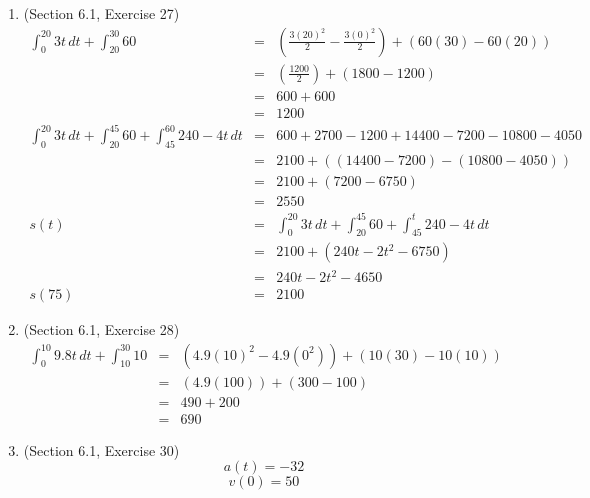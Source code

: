 \documentclass{article}
\begin{document}
\begin{enumerate}
    \item (Section 6.1, Exercise 27)
        \begin{eqnarray}
            \int_0^{20}{3t\,dt} + \int_{20}^{30}{60} &=& \left(\frac{3(20)^2}{2} - \frac{3(0)^2}{2}\right) + \left(60(30) - 60(20)\right) \\
                                                     &=& \left(\frac{1200}{2}\right) + \left(1800 - 1200\right) \\
                                                     &=& 600 + 600 \\
                                                     &=& 1200 \\
            \int_0^{20}{3t\,dt} + \int_{20}^{45}{60} + \int_{45}^{60}{240 - 4t\,dt} &=& 600 + 2700 - 1200 + 14400 - 7200 - 10800 - 4050 \\
                                                                                    &=& 2100 + \left(\left(14400 - 7200\right) - \left(10800 - 4050\right)\right) \\
                                                                                    &=& 2100 + \left(7200 - 6750\right) \\
                                                                                    &=& 2550 \\
            s(t) &=& \int_0^{20}{3t\,dt} + \int_{20}^{45}{60} + \int_{45}^{t}{240 - 4t\,dt} \\
                 &=& 2100 + \left(240t - 2t^2 - 6750\right) \\
                 &=& 240t - 2t^2 -4650 \\
            s(75) &=& 2100
        \end{eqnarray}
    \item (Section 6.1, Exercise 28)
        \begin{eqnarray}
            \int_0^{10}{9.8t\,dt} + \int_{10}^{30}{10} &=& \left(4.9(10)^2 - 4.9(0^2)\right) + \left(10(30) - 10(10)\right) \\
                                                       &=& \left(4.9(100)\right) + \left(300 - 100\right) \\
                                                       &=& 490 + 200 \\
                                                       &=& 690
        \end{eqnarray}
    \item (Section 6.1, Exercise 30)
        $$a(t) = -32$$
        $$v(0) = 50$$

\end{enumerate}
\end{document}
